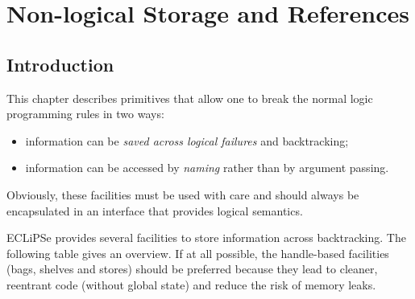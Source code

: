 %
%
%
%
%
%
%

\chapter{Non-logical Storage and References}
\label{chaparrays}

\section{Introduction}

This chapter describes primitives that allow one to break the normal logic
programming rules in two ways:
\begin{itemize}
\item information can be \emph{saved across logical failures} and backtracking;
\item information can be accessed by \emph{naming} rather than by argument
  passing.
\end{itemize}
Obviously, these facilities must be used with care and should always
be encapsulated in an interface that provides logical semantics.

ECLiPSe provides several facilities to store information across
backtracking.  The following table gives an overview.  If at all
possible, the handle-based facilities (bags, shelves and stores) should be
preferred because they lead to cleaner, reentrant code (without global
state) and reduce the risk of memory leaks.

